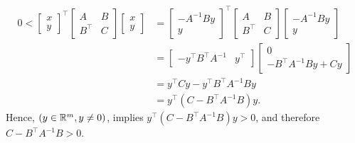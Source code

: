 		\begin{align*}		
            0 < 	\begin{bmatrix} x \\ y \end{bmatrix} ^\top \begin{bmatrix} A & B \\	B^\top & C \end{bmatrix}
			\begin{bmatrix} x \\ y \end{bmatrix}
			&= 	\begin{bmatrix} -A^{-1}By \\ y \end{bmatrix} ^\top
			\begin{bmatrix} A & B \\ 	B^\top & C	\end{bmatrix}
			\begin{bmatrix} -A^{-1}By \\ y \end{bmatrix} \\
			&= \begin{bmatrix} -y^\top B^\top A^{-1} &  y^\top \end{bmatrix}
			\begin{bmatrix} 0 \\ -B^\top A^{-1} B y+ Cy \end{bmatrix} \\
			&= y^\top Cy - y^\top B^\top A^{-1} By\\
			&= y^\top ( C - B^\top A^{-1} B )y.
		\end{align*}
Hence, $(y \in \mathbb R^m, y \neq 0)$, implies $y^\top ( C - B^\top A^{-1} B )y >0$, and therefore $ C-B^\top A^{-1} B > 0 $.\\

